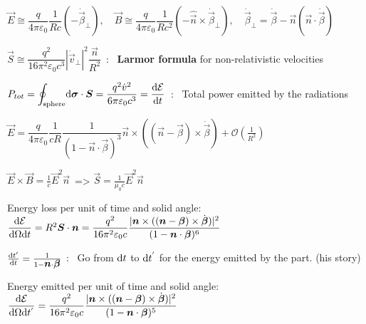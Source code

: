 \squishlist
\item $\vec{E} \cong \dfrac{q}{4\pi\varepsilon_0} \dfrac{1}{Rc} (-\dot{\vec{\beta}}_\perp), \quad \vec{B} \cong \dfrac{q}{4\pi\varepsilon_0} \dfrac{1}{Rc^2} (-\hat{\vec{n}}\times \dot{\vec{\beta}}_\perp) , \quad \dot{\vec{\beta}}_{\perp} = \dot{\vec{\beta}} - \vec{n}(\vec{n}\cdot\dot{\vec{\beta}}) $\\

\item $\vec{S} \cong \dfrac{q^2}{16 \pi^2 \varepsilon_0 c^3} |\dot{\vec{v}}_\perp|^2 \dfrac{\vec{n}}{R^2} \,$ : \, \textbf{Larmor formula} for non-relativistic velocities

\item $P_{tot} = \displaystyle{\oint_{\text{sphere}}} \mbox{\boldmath$\textrm{d} \sigma$}\cdot \mbox{\boldmath$S$} = \dfrac{q^2 \dot{v}^2}{6\pi\varepsilon_0 c^3}=\frac{\textrm{d} \mathcal{E}}{\textrm{d} t} \, $ : \, Total power emitted by the radiations
\squishend
{}
\squishlist
\item $\vec{E} = \dfrac{q}{4\pi\varepsilon_0}\dfrac{1}{cR}\dfrac{1}{(1-\vec{n}\cdot\vec{\beta})^3} \vec{n} \times ((\vec{n} - \vec{\beta}) \times \dot{\vec{\beta}}) + \mathcal{O}\left(\frac{1}{R^2}\right)$

\item $\vec{E} \times \vec{B} = \frac{1}{c} \vec{E}^2 \vec{n} \, $ => $\vec{S} = \frac{1}{\mu_0 c} \vec{E}^2\vec{n}$

\item Energy loss per unit of time and solid angle: $\dfrac{\textrm{d} \mathcal{E}}{\textrm{d} \Omega \textrm{d} t} = R^2\mbox{\boldmath$S$}\cdot\mbox{\boldmath$n$} = \dfrac{q^2}{16\pi^2 \varepsilon_0 c} \dfrac{|\mbox{\boldmath$n$}\times ((\mbox{\boldmath$n$}-\mbox{\boldmath$\beta$}) \times \dot{\mbox{\boldmath$\beta$}})|^2}{(1-\mbox{\boldmath$n$}\cdot\mbox{\boldmath$\beta$})^6}$

\item $\frac{\textrm{d} t'}{\textrm{d} t} = \frac{1}{1-\mbox{\boldmath$n$}\cdot\mbox{\boldmath$\beta$}}$ : \  Go from $\textrm{d} t$ to $\textrm{d} t^{'}$ for the energy emitted by the part. (his story)  
\\
\item Energy emitted per unit of time and solid angle:
$\dfrac{\textrm{d} \mathcal{E}}{\textrm{d} \Omega \textrm{d} t^{'}} = \dfrac{q^2}{16\pi^2 \varepsilon_0 c} \dfrac{|\mbox{\boldmath$n$}\times ((\mbox{\boldmath$n$}-\mbox{\boldmath$\beta$}) \times \dot{\mbox{\boldmath$\beta$}})|^2}{(1-\mbox{\boldmath$n$}\cdot\mbox{\boldmath$\beta$})^5}$

\squishend


